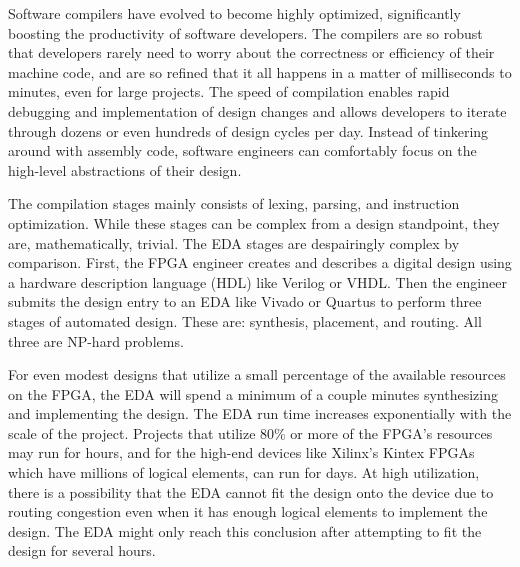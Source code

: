 \documentclass{article}
\begin{document}
Software compilers have evolved to become highly optimized, significantly boosting the productivity of software developers. 
The compilers are so robust that developers rarely need to worry about the correctness or efficiency of their machine code, and are so refined that it all happens in a matter of milliseconds to minutes, even for large projects. %
The speed of compilation enables rapid debugging and implementation of design changes and allows developers to iterate through dozens or even hundreds of design cycles per day.
Instead of tinkering around with assembly code, software engineers can comfortably focus on the high-level abstractions of their design. 


The compilation stages mainly consists of lexing, parsing, and instruction optimization.
While these stages can be complex from a design standpoint, they are, mathematically, trivial.
The EDA stages are despairingly complex by comparison. 
First, the FPGA engineer creates and describes a digital design using a hardware description language (HDL) like Verilog or VHDL.     
Then the engineer submits the design entry to an EDA like Vivado or Quartus to perform three stages of automated design. 
These are: synthesis, placement, and routing. 
All three are NP-hard problems.

For even modest designs that utilize a small percentage of the available resources on the FPGA, the EDA will spend a minimum of a couple minutes synthesizing and implementing the design.
The EDA run time increases exponentially with the scale of the project. 
Projects that utilize 80\% or more of the FPGA's resources may run for hours, and for the high-end devices like Xilinx's Kintex FPGAs which have millions of logical elements, can run for days.
At high utilization, there is a possibility that the EDA cannot fit the design onto the device due to routing congestion even when it has enough logical elements to implement the design. 
The EDA might only reach this conclusion after attempting to fit the design for several hours. 
\end{document}

